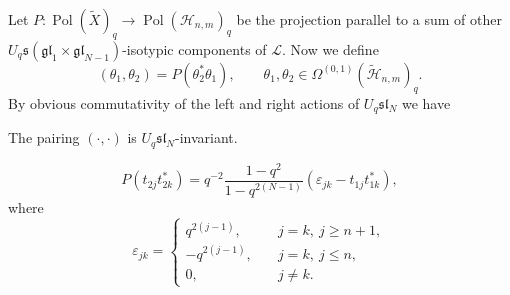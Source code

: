Let $P: \operatorname{Pol}(\widetilde{X})_q \rightarrow \operatorname{Pol}({\mathscr{H}}_{n,m})_q$ be the
projection parallel to a sum of other $U_q \mathfrak{s}(\mathfrak{gl}_1 \times \mathfrak{gl}_{N-1})$-isotypic components of $\mathcal{L}$. Now we def\/ine
\[
(\theta_1,\theta_2)=P(\theta^*_2\theta_1), \qquad \theta_1,\theta_2 \in \Omega^{(0,1)}(\widetilde{\mathscr{H}}_{n,m})_q.
\]
By obvious commutativity of the left and right actions of $U_q \mathfrak{sl}_N$ we have

\begin{proposition}
The pairing $(\cdot,\cdot)$ is $U_q \mathfrak{sl}_N$-invariant.
\end{proposition}
\begin{lemma}
\[P(t_{2j}t^*_{2k})=q^{-2}\frac{1-q^2}{1-q^{2(N-1)}}(\varepsilon_{jk}-t_{1j}t^*_{1k}),\] where
\[
\varepsilon_{jk}=\begin{cases} q^{2(j-1)}, \quad & j=k, \  j \geq n+1, \\
-q^{2(j-1)}, \quad & j=k, \  j \leq n, \\
0, \quad & j \neq k.
\end{cases}
\]
\end{lemma}
